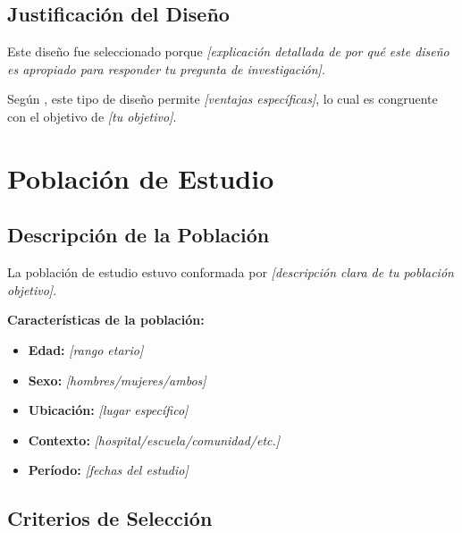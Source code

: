 
\subsection{Justificación del Diseño}
\label{subsec:justificacion_diseño}

Este diseño fue seleccionado porque \textit{[explicación detallada de por qué este diseño es apropiado para responder tu pregunta de investigación]}.

Según \cite{autor_diseños}, este tipo de diseño permite \textit{[ventajas específicas]}, lo cual es congruente con el objetivo de \textit{[tu objetivo]}.

\section{Población de Estudio}
\label{sec:poblacion}

\subsection{Descripción de la Población}
\label{subsec:descripcion_poblacion}

La población de estudio estuvo conformada por \textit{[descripción clara de tu población objetivo]}.

\textbf{Características de la población:}

\begin{itemize}
    \item \textbf{Edad:} \textit{[rango etario]}
    \item \textbf{Sexo:} \textit{[hombres/mujeres/ambos]}
    \item \textbf{Ubicación:} \textit{[lugar específico]}
    \item \textbf{Contexto:} \textit{[hospital/escuela/comunidad/etc.]}
    \item \textbf{Período:} \textit{[fechas del estudio]}
\end{itemize}

\subsection{Criterios de Selección}
\label{subsec:criterios_seleccion}

